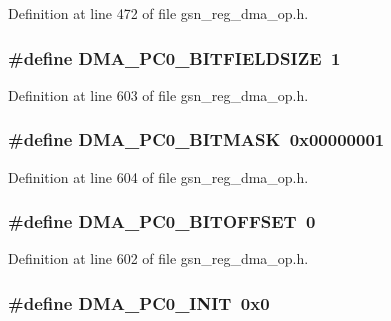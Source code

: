 Definition at line 472 of file gsn\_\-reg\_\-dma\_\-op.h.

\hypertarget{a00547_aea542224fcd0fbadd5ab1ee3094c85da}{
\subsubsection[{DMA\_\-PC0\_\-BITFIELDSIZE}]{\setlength{\rightskip}{0pt plus 5cm}\#define DMA\_\-PC0\_\-BITFIELDSIZE~1}}
\label{a00547_aea542224fcd0fbadd5ab1ee3094c85da}


Definition at line 603 of file gsn\_\-reg\_\-dma\_\-op.h.

\hypertarget{a00547_aba1f7f5aa23a474f5887516c98b26563}{
\subsubsection[{DMA\_\-PC0\_\-BITMASK}]{\setlength{\rightskip}{0pt plus 5cm}\#define DMA\_\-PC0\_\-BITMASK~0x00000001}}
\label{a00547_aba1f7f5aa23a474f5887516c98b26563}


Definition at line 604 of file gsn\_\-reg\_\-dma\_\-op.h.

\hypertarget{a00547_a3d27bc23ca5e54a254421a73b26cdb19}{
\subsubsection[{DMA\_\-PC0\_\-BITOFFSET}]{\setlength{\rightskip}{0pt plus 5cm}\#define DMA\_\-PC0\_\-BITOFFSET~0}}
\label{a00547_a3d27bc23ca5e54a254421a73b26cdb19}


Definition at line 602 of file gsn\_\-reg\_\-dma\_\-op.h.

\hypertarget{a00547_a8452ecb69e450977ef4360e923801cf6}{
\subsubsection[{DMA\_\-PC0\_\-INIT}]{\setlength{\rightskip}{0pt plus 5cm}\#define DMA\_\-PC0\_\-INIT~0x0}}
\label{a00547_a8452ecb69e450977ef4360e923801cf6}


